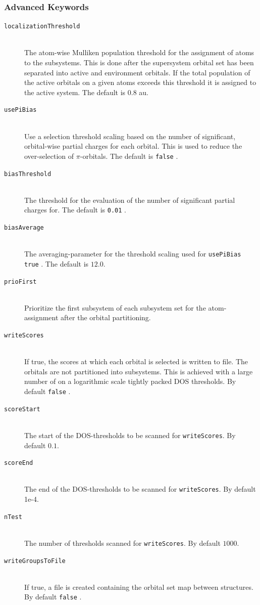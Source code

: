\documentclass[bibliography=totocnumbered,a4paper,10pt,oneside]{scrbook}
\newcommand{\ttt}[1]{%
  \begingroup\setlength{\fboxsep}{1pt}%
  \colorbox{serenity-green!30}{\texttt{\hspace*{2pt}\vphantom{(g}#1\hspace*{2pt}}}%
  \endgroup
}
\begin{document}
\subsubsection{Advanced Keywords}
\begin{description}
    \item [\texttt{localizationThreshold}]\hfill \\
    The atom-wise Mulliken population threshold for the assignment of atoms to the subsystems. This is done
    after the supersystem orbital set has been separated into active and environment orbitals. If the total
    population of the active orbitals on a given atoms exceeds this threshold it is assigned to the active
    system. The default is $0.8$ au.
    \item [\texttt{usePiBias}]\hfill \\
    Use a selection threshold scaling based on the number of significant, orbital-wise partial charges for
    each orbital. This is used to reduce the over-selection of $\pi$-orbitals. The default is \ttt{false}.
    \item [\texttt{biasThreshold}]\hfill \\
    The threshold for the evaluation of the number of significant partial charges for. The default is
    \ttt{0.01}.
    \item [\texttt{biasAverage}]\hfill \\
    The averaging-parameter for the threshold scaling used for \ttt{usePiBias true}.
    The default is $12.0$.
    \item [\texttt{prioFirst}]\hfill \\
    Prioritize the first subsystem of each subsystem set for the atom-assignment after
    the orbital partitioning.
    \item [\texttt{writeScores}]\hfill \\
    If true, the scores at which each orbital is selected is written to file.
    The orbitals are not partitioned into subsystems.
    This is achieved with a large number of on a logarithmic scale tightly packed DOS thresholds.
    By default \ttt{false}.
    \item [\texttt{scoreStart}]\hfill \\
    The start of the DOS-thresholds to be scanned for \texttt{writeScores}.
    By default $0.1$.
    \item [\texttt{scoreEnd}]\hfill \\
    The end of the DOS-thresholds to be scanned for \texttt{writeScores}.
    By default 1e-4.
    \item [\texttt{nTest}]\hfill \\
    The number of thresholds scanned for \texttt{writeScores}. By default $1000$.
    \item [\texttt{writeGroupsToFile}]\hfill \\
    If true, a file is created containing the orbital set map between structures. By default \ttt{false}.
 \end{description}
\end{document}

